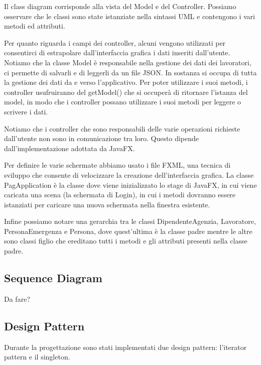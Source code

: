 \documentclass{article}
\begin{document}
    Il class diagram corrisponde alla vista del Model e del Controller.
Possiamo osservare che le classi sono state istanziate nella sintassi UML e contengono i vari metodi ed attributi.

Per quanto riguarda i campi dei controller, alcuni vengono utilizzati per consentirci di estrapolare dall'interfaccia grafica i dati inseriti dall'utente.
Notiamo che la classe Model è responsabile nella gestione dei dati dei lavoratori, ci permette di salvarli e di leggerli da un file JSON. In sostanza si occupa di tutta la gestione dei dati da e verso l'applicativo. Per poter utilizzare i suoi metodi, i controller usufruiranno del getModel() che si occuperà di ritornare l'istanza del model, in modo che i controller possano utilizzare i suoi metodi per leggere o scrivere i dati.

Notiamo che i controller che sono responsabili delle varie operazioni richieste dall'utente non sono in comunicazione tra loro. Questo dipende dall’implementazione adottata da JavaFX.

Per definire le varie schermate abbiamo usato i file FXML, una tecnica di sviluppo che consente di velocizzare la creazione dell’interfaccia grafica. 
La classe PagApplication è la classe dove viene inizializzato lo stage di JavaFX, in cui viene caricata una scena (la schermata di Login),
in cui i metodi dovranno essere istanziati per caricare una nuova schermata nella finestra esistente.

Infine possiamo notare una gerarchia tra le classi DipendenteAgenzia, Lavoratore, PersonaEmergenza e Persona, dove quest'ultima è la classe padre mentre le altre sono classi figlio che ereditano tutti i metodi e gli attributi presenti nella classe padre.



    \subsection{Sequence Diagram}

    Da fare?

    \subsection{Design Pattern}

    Durante la progettazione sono stati implementati due design pattern: l'iterator pattern e il singleton.
\end{document}

